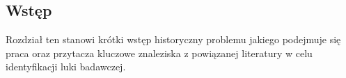 \subsection{Wstęp}

Rozdział ten stanowi krótki wstęp historyczny problemu jakiego podejmuje się praca oraz przytacza kluczowe znaleziska z powiązanej literatury w celu identyfikacji luki badawczej. 
